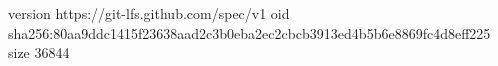 version https://git-lfs.github.com/spec/v1
oid sha256:80aa9ddc1415f23638aad2c3b0eba2ec2cbcb3913ed4b5b6e8869fc4d8eff225
size 36844
